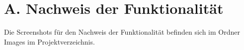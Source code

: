 
\addchap{\langanhang}


\section*{A. Nachweis der Funktionalität}\label{sec:NachweisFunktionalitaet}
Die Screenshots für den Nachweis der Funktionalität befinden sich im Ordner Images im Projektverzeichnis.
\pagebreak

 